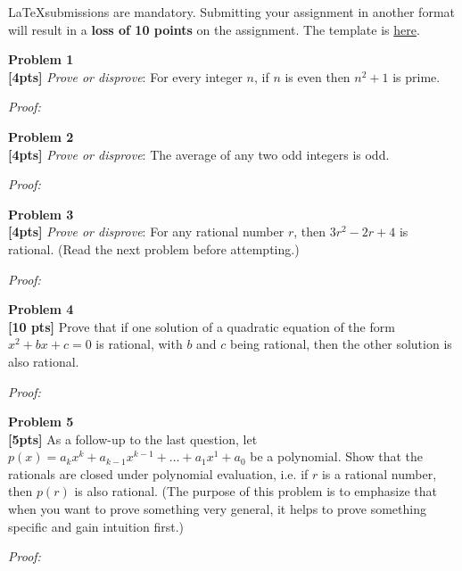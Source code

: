 \documentclass{article}
\newenvironment{problem}[2][Problem]
    { \begin{mdframed}[backgroundcolor=gray!20] \textbf{#1 #2} \\}
    {  \end{mdframed}}
\newenvironment{solution}
    {\textit{Proof:}}
    {}
\begin{document}
\begin{mdframed}[backgroundcolor=blue!20]
\LaTeX submissions are mandatory. Submitting your assignment in another format will result in a \textbf{loss of 10 points} on the assignment. The template is \href{https://www.overleaf.com/read/cxzsjxxwhvgg}{here}.
\end{mdframed}

\begin{problem}{1}
\textbf{[4pts]} \textit{Prove or disprove}: For every integer $n$, if $n$ is even then $n^2 + 1$ is prime. 
\end{problem}
\begin{solution}
\end{solution}

\begin{problem}{2}
\textbf{[4pts]} \textit{Prove or disprove}: The average of any two odd integers is odd. 
\end{problem}
\begin{solution}
\end{solution}

\begin{problem}{3}
\textbf{[4pts]} \textit{Prove or disprove}: For any rational number $r$, then $3r^2 - 2r + 4$ is rational. (Read the next problem before attempting.)
\end{problem}
\begin{solution}
\end{solution}

\begin{problem}{4}
\textbf{[10 pts]} Prove that if one solution of a quadratic equation of the form $x^2 + bx + c = 0$ is rational, with $b$ and $c$ being rational, then the other solution is also rational.
\end{problem}
\begin{solution}
\end{solution}

\begin{problem}{5}
\textbf{[5pts]} As a follow-up to the last question, let $p(x) = a_k x^k + a_{k-1} x^{k-1} + \ldots + a_1 x^1 + a_0$ be a polynomial. Show that the rationals are closed under polynomial evaluation, i.e. if $r$ is a rational number, then $p(r)$ is also rational. (The purpose of this problem is to emphasize that when you want to prove something very general, it helps to prove something specific and gain intuition first.)
\end{problem}
\begin{solution}
\end{solution}
\end{document}
